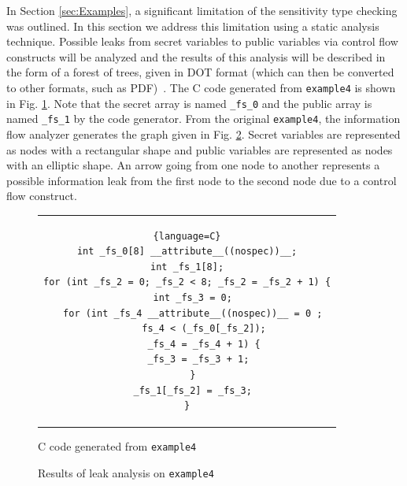 \documentclass[10pt, conference]{IEEEtran}
\newcommand{\ttt}{\texttt}
\begin{document}
In Section \ref{sec:Examples}, a significant limitation of the sensitivity type checking
was outlined. In this section we address this limitation using a static analysis technique.
Possible leaks from secret variables to public variables via control flow constructs will
be analyzed and the results of this analysis will be described in the form of
a forest of trees, given in DOT format (which can then be converted to other formats,
such as PDF)~\cite{DOT}. The C code generated from \ttt{example4} is shown in Fig. \ref{fig:GenC4}.
Note that the secret array is named \verb|_fs_0| and the public array is named \verb|_fs_1| by the
code generator. From the original \ttt{example4}, the information flow analyzer generates the
graph given in Fig. \ref{fig:Analysis4}. Secret variables are represented as nodes with
a rectangular shape and public variables are represented as nodes with an elliptic shape. An
arrow going from one node to another represents a possible information leak from the first
node to the second node due to a control flow construct.

\begin{figure}
\begin{center}
\begin{tabular}{c}
\begin{lstlisting}{language=C}
int _fs_0[8] __attribute__((nospec))__;
int _fs_1[8];
for (int _fs_2 = 0; _fs_2 < 8; _fs_2 = _fs_2 + 1) {
  int _fs_3 = 0;
  for (int _fs_4 __attribute__((nospec))__ = 0 ;
      fs_4 < (_fs_0[_fs_2]);
      _fs_4 = _fs_4 + 1) {
    _fs_3 = _fs_3 + 1;
  }
  _fs_1[_fs_2] = _fs_3;
}
\end{lstlisting}
\end{tabular}
\end{center}
\caption{C code generated from \ttt{example4}}
\label{fig:GenC4}
\end{figure}

\begin{figure}
\centering
\caption{Results of leak analysis on \ttt{example4}}
\label{fig:Analysis4}
\end{figure}
\end{document}
